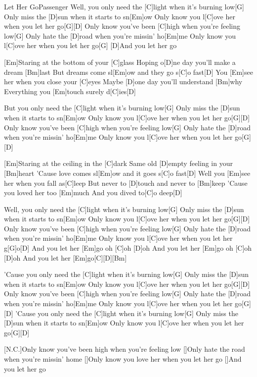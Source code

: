 \documentclass[../main.tex]{subfiles}
\begin{document}
\begin{song}{Let Her Go}{Passenger}{}
Well, you only need the [C]light when it's burning low[G]{\hh}
Only miss the [D]sun when it starts to sn[Em]ow
Only know you l[C]ove her when you let her go[G]{\hh}[D]{\hh}
Only know you've been [C]high when you're feeling low[G]{\hh}
Only hate the [D]road when you're missin' ho[Em]me
Only know you l[C]ove her when you let her go[G]{\hh}
[D]And you let her go

[Em]Staring at the bottom of your [C]glass
Hoping o[D]ne day you'll make a dream [Bm]last
But dreams come sl[Em]ow and they go s[C]o fast[D]{\hh}
You [Em]see her when you close your [C]eyes
Maybe [D]one day you'll understand [Bm]why
Everything you [Em]touch surely d[C]ies[D]{\hh}

But you only need the [C]light when it's burning low[G]{\hh}
Only miss the [D]sun when it starts to sn[Em]ow
Only know you l[C]ove her when you let her go[G]{\hh}[D]{\hh}
Only know you've been [C]high when you're feeling low[G]{\hh}
Only hate the [D]road when you're missin' ho[Em]me
Only know you l[C]ove her when you let her go[G]{\hh}[D]{\hh}

[Em]Staring at the ceiling in the [C]dark
Same old [D]empty feeling in your [Bm]heart
'Cause love comes sl[Em]ow and it goes s[C]o fast[D]{\hh}
Well you [Em]see her when you fall as[C]leep
But never to [D]touch and never to [Bm]keep
'Cause you loved her too [Em]much
And you dived to[C]o deep[D]{\hh}

Well, you only need the [C]light when it's burning low[G]{\hh}
Only miss the [D]sun when it starts to sn[Em]ow
Only know you l[C]ove her when you let her go[G]{\hh}[D]{\hh}
Only know you've been [C]high when you're feeling low[G]{\hh}
Only hate the [D]road when you're missin' ho[Em]me
Only know you l[C]ove her when you let her g[G]o[D]{\hh}
\pagebreak
And you let her [Em]go oh [C]oh [D]oh
And you let her [Em]go oh [C]oh [D]oh
And you let her [Em]go[C]{\hh}[D]{\hh}[Bm]{\hh}

'Cause you only need the [C]light when it's burning low[G]{\hh}
Only miss the [D]sun when it starts to sn[Em]ow
Only know you l[C]ove her when you let her go[G]{\hh}[D]{\hh}
Only know you've been [C]high when you're feeling low[G]{\hh}
Only hate the [D]road when you're missin' ho[Em]me
Only know you l[C]ove her when you let her go[G]{\hh}[D]{\hh}
'Cause you only need the [C]light when it's burning low[G]{\hh}
Only miss the [D]sun when it starts to sn[Em]ow
Only know you l[C]ove her when you let her go[G]{\hh}[D]{\hh}

[N.C.]Only know you've been high when you're feeling low
[]Only hate the road when you're missin' home
[]Only know you love her when you let her go
[]And you let her go
\end{song}
\end{document}
